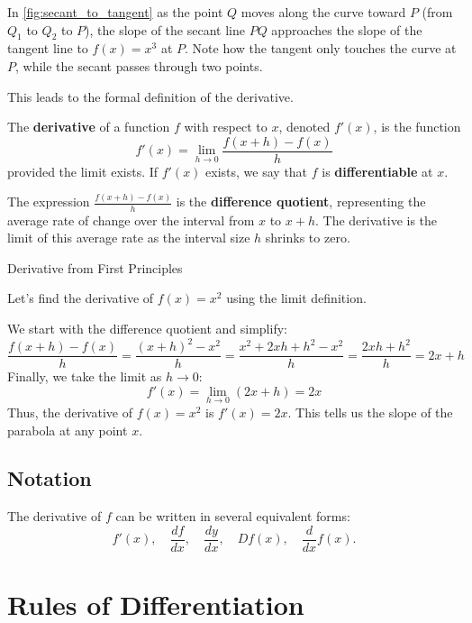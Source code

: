     In \autoref{fig:secant_to_tangent} as the point $Q$ moves along the curve toward $P$ (from $Q_1$ to $Q_2$ to $P$), the slope of the secant line $PQ$ approaches the slope of the tangent line to $f(x) = x^3$ at $P$. Note how the tangent only touches the curve at $P$, while the secant passes through two points.
    
    This leads to the formal definition of the derivative.
    
    \begin{definition}
    The \textbf{derivative} of a function \( f \) with respect to \( x \), denoted \( f'(x) \), is the function
    \[
    f'(x) = \lim_{h \to 0} \frac{f(x+h) - f(x)}{h}
    \]
    provided the limit exists. If \( f'(x) \) exists, we say that \( f \) is \textbf{differentiable} at \( x \).
    \end{definition}
    
    The expression \( \frac{f(x+h) - f(x)}{h} \) is the \textbf{difference quotient}, representing the average rate of change over the interval from \(x\) to \(x+h\). The derivative is the limit of this average rate as the interval size \(h\) shrinks to zero.
    
    \begin{example} Derivative from First Principles
        
    Let's find the derivative of \( f(x) = x^2 \) using the limit definition.
    \end{example}
    \begin{solution}
    We start with the difference quotient and simplify:
    \[
    \frac{f(x+h) - f(x)}{h} = \frac{(x+h)^2 - x^2}{h} = \frac{x^2 + 2xh + h^2 - x^2}{h} = \frac{2xh + h^2}{h} = 2x + h
    \]
    Finally, we take the limit as \( h \to 0 \):
    \[
    f'(x) = \lim_{h \to 0} (2x + h) = 2x
    \]
    Thus, the derivative of \( f(x) = x^2 \) is \( f'(x) = 2x \). This tells us the slope of the parabola at any point \(x\).
    \end{solution}

\subsection*{Notation}
The derivative of $f$ can be written in several equivalent forms:
\[
f'(x), \quad \frac{df}{dx}, \quad \frac{dy}{dx}, \quad Df(x), \quad \frac{d}{dx}f(x).
\]

\section{Rules of Differentiation}
\label{sec:ch10-rules}

